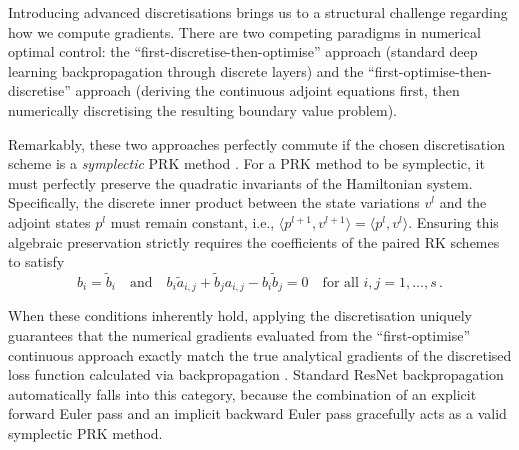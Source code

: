 Introducing advanced discretisations brings us to a structural challenge regarding how we compute gradients. There are two competing paradigms in numerical optimal control: the ``first-discretise-then-optimise'' approach (standard deep learning backpropagation through discrete layers) and the ``first-optimise-then-discretise'' approach (deriving the continuous adjoint equations first, then numerically discretising the resulting boundary value problem).

Remarkably, these two approaches perfectly commute if the chosen discretisation scheme is a \emph{symplectic} PRK method \cite{benning2019deep, hager2000runge}. For a PRK method to be symplectic, it must perfectly preserve the quadratic invariants of the Hamiltonian system. Specifically, the discrete inner product between the state variations $v^l$ and the adjoint states $p^l$ must remain constant, i.e., $\langle p^{l+1}, v^{l+1} \rangle = \langle p^l, v^l \rangle$. Ensuring this algebraic preservation strictly requires the coefficients of the paired RK schemes to satisfy
\begin{equation}
    b_i = \tilde{b}_i \quad \text{and} \quad b_i\tilde{a}_{i,j} + \tilde{b}_j a_{i,j} - b_i\tilde{b}_j = 0 \quad \text{for all } i, j = 1, \dots, s \, .
    \label{eq:symplectic_conditions}
\end{equation}

When these conditions inherently hold, applying the discretisation uniquely guarantees that the numerical gradients evaluated from the ``first-optimise'' continuous approach exactly match the true analytical gradients of the discretised loss function calculated via backpropagation \cite{hager2000runge, sanzserna2015sympletic}. Standard ResNet backpropagation automatically falls into this category, because the combination of an explicit forward Euler pass and an implicit backward Euler pass gracefully acts as a valid symplectic PRK method.

